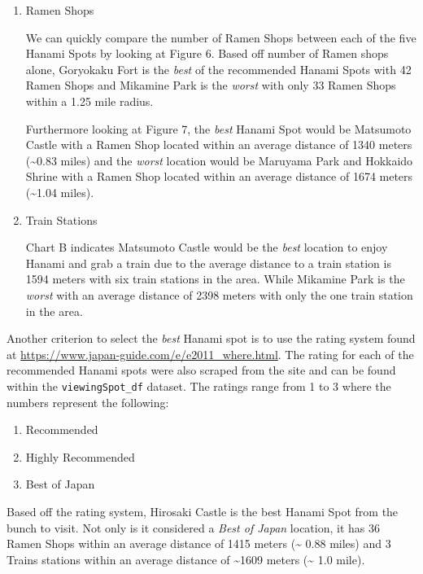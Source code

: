 \documentclass[11pt]{article}
\begin{document}
\begin{enumerate}
\def\labelenumi{\arabic{enumi})}
\item
  Ramen Shops

  We can quickly compare the number of Ramen Shops between each of the
  five Hanami Spots by looking at Figure 6. Based off number of Ramen
  shops alone, Goryokaku Fort is the \emph{best} of the recommended Hanami
  Spots with 42 Ramen Shops and Mikamine Park is the \emph{worst} with only
  33 Ramen Shops within a 1.25 mile radius. 
  
  Furthermore looking at Figure 7, the \emph{best} Hanami Spot would be Matsumoto Castle with a Ramen Shop
  located within an average distance of 1340 meters
  (\textasciitilde0.83 miles) and the \emph{worst} location would be
  Maruyama Park and Hokkaido Shrine with a Ramen Shop located within an
  average distance of 1674 meters (\textasciitilde1.04
  miles).
\item
  Train Stations

  Chart B indicates Matsumoto Castle would be the \emph{best} location to enjoy
  Hanami and grab a train due to the average distance to a train station
  is 1594 meters with six train stations in the area.
  While Mikamine Park is the \emph{worst} with an average distance of
  2398 meters with only the one train station in the
  area.
\end{enumerate}

Another criterion to select the \emph{best} Hanami spot is to use the
rating system found at \url{https://www.japan-guide.com/e/e2011_where.html}. 
The rating for each of the recommended Hanami spots were also scraped from 
the site and can be found within the \texttt{viewingSpot\_df} dataset. The 
ratings range from 1 to 3 where the numbers represent the following:

\begin{enumerate}
\def\labelenumi{\arabic{enumi})}
\item
  Recommended
\item
  Highly Recommended
\item
  Best of Japan
\end{enumerate}


        
    Based off the rating system, Hirosaki Castle is the best Hanami Spot
from the bunch to visit. Not only is it considered a \emph{Best of Japan}
location, it has 36 Ramen Shops within an average distance of
1415 meters (\textasciitilde{} 0.88 miles) and 3 Trains
stations within an average distance of \textasciitilde1609 meters
(\textasciitilde{} 1.0 mile).
\end{document}
